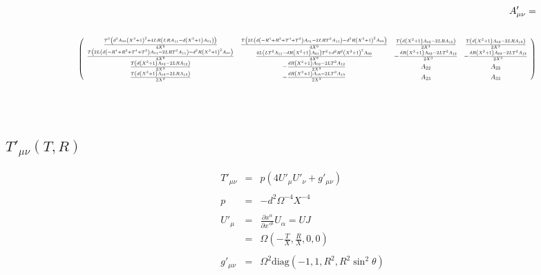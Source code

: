 \documentclass[10pt,letterpaper]{article}
\numberwithin{equation}{section}
\newcommand\scalemath[2]{\scalebox{#1}{\mbox{\ensuremath{\displaystyle #2}}}}
\begin{document}
\begin{eqnarray}
&&A'_{\mu\nu} = 
\\ \nonumber\\
&&
\scalemath{0.65}{
\left(
\begin{array}{cccc}
\frac{T^2 \left(d^2 A_{00} \left(X^2+1\right)^2+4 L R \left(L R A_{11}-d \left(X^2+1\right) A_{01}\right)\right)}{4 X^6} & \frac{T \left(2 L \left(d \left(-R^4+R^2+T^4+T^2\right) A_{01}-2 L R T^2 A_{11}\right)-d^2 R \left(X^2+1\right)^2 A_{00}\right)}{4 X^6} & \frac{T \left(d \left(X^2+1\right) A_{02}-2 L R A_{12}\right)}{2 X^3} & \frac{T \left(d \left(X^2+1\right) A_{03}-2 L R A_{13}\right)}{2 X^3} \\
\frac{T \left(2 L \left(d \left(-R^4+R^2+T^4+T^2\right) A_{01}-2 L R T^2 A_{11}\right)-d^2 R \left(X^2+1\right)^2 A_{00}\right)}{4 X^6} & \frac{4 L \left(L T^2 A_{11}-d R \left(X^2+1\right) A_{01}\right) T^2+d^2 R^2 \left(X^2+1\right)^2 A_{00}}{4 X^6} & -\frac{d R \left(X^2+1\right) A_{02}-2 L T^2 A_{12}}{2 X^3} & -\frac{d R \left(X^2+1\right) A_{03}-2 L T^2 A_{13}}{2 X^3} \\
\frac{T \left(d \left(X^2+1\right) A_{02}-2 L R A_{12}\right)}{2 X^3} & -\frac{d R \left(X^2+1\right) A_{02}-2 L T^2 A_{12}}{2 X^3} & A_{22} & A_{23} \\
\frac{T \left(d \left(X^2+1\right) A_{03}-2 L R A_{13}\right)}{2 X^3} & -\frac{d R \left(X^2+1\right) A_{03}-2 L T^2 A_{13}}{2 X^3} & A_{23} & A_{33} \\
\end{array}
\right)
}
\nonumber
\end{eqnarray}
%
%
%
\\ \\
\subsection{$T'_{\mu\nu}(T,R)$}
\begin{eqnarray}
T'_{\mu\nu} &=& p(4U'_\mu U'_\nu + g'_{\mu\nu})
\\ \nonumber\\
p &=& -d^2 \Omega^{-4} X^{-4}
\\ \nonumber\\
U'_{\mu} &=& \frac{\partial x^\alpha}{\partial x'^\mu}U_\alpha = U J
\nonumber\\
&=& \Omega \left( -\frac{T}{X},\frac{R}{X},0,0\right) 
\\ \nonumber\\
g'_{\mu\nu} &=& \Omega^2 \text{diag}\left(-1,1,R^2,R^2\sin^2\theta\right)
\end{eqnarray}
%
%
%
%
\end{document}
